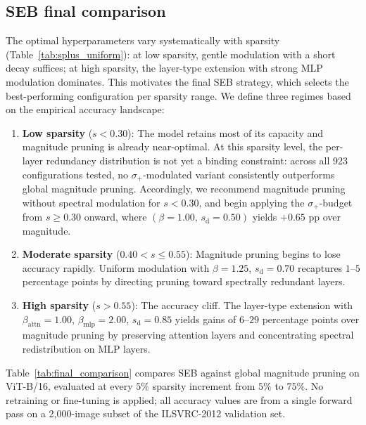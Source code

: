 \documentclass[11pt]{article}
\theoremstyle{plain}
\theoremstyle{definition}
\theoremstyle{remark}
\newcommand{\1}{\mathbf{1}}
\begin{document}
\subsection{SEB final comparison}
\label{subsec:final_comparison}

The optimal hyperparameters vary systematically with sparsity (Table~\ref{tab:splus_uniform}): at low sparsity, gentle modulation with a short decay suffices; at high sparsity, the layer-type extension with strong MLP modulation dominates.  This motivates the final SEB strategy, which selects the best-performing configuration per sparsity range.  We define three regimes based on the empirical accuracy landscape:

\begin{enumerate}[leftmargin=2em]
\item \textbf{Low sparsity} (\(s < 0.30\)):  The model retains most of its capacity and magnitude pruning is already near-optimal.  At this sparsity level, the per-layer redundancy distribution is not yet a binding constraint: across all 923 configurations tested, no \(\sigma_+\)-modulated variant consistently outperforms global magnitude pruning.  Accordingly, we recommend magnitude pruning without spectral modulation for \(s < 0.30\), and begin applying the \(\sigma_+\)-budget from \(s \ge 0.30\) onward, where \((\beta=1.00,\, s_{\mathrm{d}}=0.50)\) yields \(+0.65\) pp over magnitude.

\item \textbf{Moderate sparsity} (\(0.40 < s \le 0.55\)):  Magnitude pruning begins to lose accuracy rapidly.  Uniform modulation with \(\beta=1.25\), \(s_{\mathrm{d}}=0.70\) recaptures \(1\)--\(5\) percentage points by directing pruning toward spectrally redundant layers.

\item \textbf{High sparsity} (\(s > 0.55\)):  The accuracy cliff.  The layer-type extension with \(\beta_{\mathrm{attn}}=1.00\), \(\beta_{\mathrm{mlp}}=2.00\), \(s_{\mathrm{d}}=0.85\) yields gains of \(6\)--\(29\) percentage points over magnitude pruning by preserving attention layers and concentrating spectral redistribution on MLP layers.
\end{enumerate}

Table~\ref{tab:final_comparison} compares SEB against global magnitude pruning on ViT-B/16, evaluated at every \(5\%\) sparsity increment from \(5\%\) to \(75\%\).  No retraining or fine-tuning is applied; all accuracy values are from a single forward pass on a 2{,}000-image subset of the ILSVRC-2012 validation set.
\end{document}
